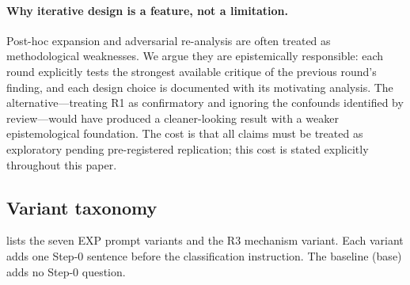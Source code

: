 \documentclass[11pt,a4paper]{article}
\begin{document}
\paragraph{Why iterative design is a feature, not a limitation.}
Post-hoc expansion and adversarial re-analysis are often treated as
methodological weaknesses.  We argue they are epistemically responsible:
each round explicitly tests the strongest available critique of the previous
round's finding, and each design choice is documented with its motivating
analysis.  The alternative---treating R1 as confirmatory and ignoring the
confounds identified by review---would have produced a cleaner-looking result
with a weaker epistemological foundation.  The cost is that all claims must
be treated as exploratory pending pre-registered replication; this cost is
stated explicitly throughout this paper.

\subsection{Variant taxonomy}

 lists the seven EXP prompt variants and the R3 mechanism
variant.  Each variant adds one Step-0 sentence before the classification
instruction.  The baseline (\textsf{base}) adds no Step-0 question.

\begin{table}[htbp]
\centering
\caption{Variant taxonomy.
  [\emph{Source: findings-structured.md, variant design section}]}
\label{tab:variants}
\smallskip
{}%
\end{table}
\end{document}
